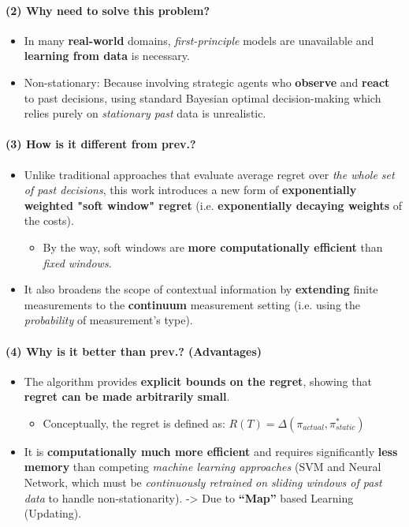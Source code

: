 \documentclass{article}
\begin{document}
\paragraph{(2) Why need to solve this problem?}
\begin{itemize}
  \item In many \textbf{real-world} domains, \textit{first-principle} models are unavailable and \textbf{learning from data} is necessary.
  \item Non-stationary: Because involving strategic agents who \textbf{observe} and \textbf{react} to past decisions, using standard Bayesian optimal decision-making which relies purely on \textit{stationary past} data is unrealistic.
\end{itemize}

\paragraph{(3) How is it different from prev.?}
\begin{itemize}
  \item Unlike traditional approaches that evaluate average regret over \textit{the whole set of past decisions}, this work introduces a new form of \textbf{exponentially weighted "soft window" regret} (i.e. \textbf{exponentially decaying weights} of the costs).
  \begin{itemize}
    \item By the way, soft windows are \textbf{more computationally efficient} than \textit{fixed windows}.
  \end{itemize}
  \item It also broadens the scope of contextual information by \textbf{extending} finite measurements to the \textbf{continuum} measurement setting (i.e. using the \textit{probability} of measurement's type).
\end{itemize}

\paragraph{(4) Why is it better than prev.? (Advantages)} 
\begin{itemize}
  \item The algorithm provides \textbf{explicit bounds on the regret}, showing that \textbf{regret can be made arbitrarily small}.
  \begin{itemize}
    \item Conceptually, the regret is defined as: $R(T) = \Delta(\pi_{actual}, \pi_{static}^*)$
  \end{itemize}
  \item It is \textbf{computationally much more efficient} and requires significantly \textbf{less memory} than competing \textit{machine learning approaches} (SVM and Neural Network, which must be \textit{continuously retrained on sliding windows of past data} to handle non-stationarity). -> Due to \textbf{``Map''} based Learning (Updating).
\end{itemize}
\end{document}
